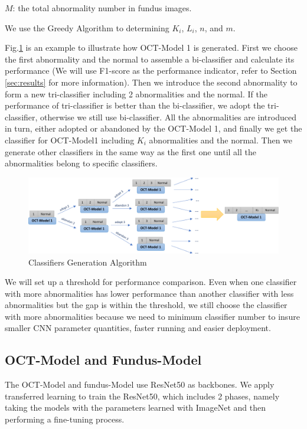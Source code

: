 \documentclass{article}
\begin{document}
		$M$: the total abnormality number in fundus images.
		
		\vspace{0.3cm}		
		We use the Greedy Algorithm to determining $K_i$, $L_i$, $n$, and $m$.
		
		Fig.\ref{fig:classifier} is an example to illustrate how OCT-Model 1 is generated.  First we choose the first abnormality and the normal to assemble a bi-classifier and calculate its performance (We will use F1-score as the performance indicator, refer to Section \ref{sec:results} for more information).  Then we introduce the second abnormality to form a new tri-classifier including 2 abnormalities and the normal.  If the performance of tri-classifier is better than the bi-classifier, we adopt the tri-classifier, otherwise we still use bi-classifier.  All the abnormalities are introduced in turn, either adopted or abandoned by the OCT-Model 1, and finally we get the classifier for OCT-Model1 including $K_i$ abnormalities and the normal.  Then we generate other classifiers in the same way as the first one until all the abnormalities belong to specific classifiers.

		\vspace{0.5cm}

		\begin{figure}[htbp]
			\centering
			\includegraphics[width=\linewidth]{Classifier.pdf}
			\caption{Classifiers Generation Algorithm}
			\label{fig:classifier}
		\end{figure}

		\vspace{0.5cm}	
		
		We will set up a threshold for performance comparison.  Even when one classifier with more abnormalities has lower performance than another classifier with less abnormalities but the gap is within the threshold, we still choose the classifier with more abnormalities because we need to minimum classifier number to insure smaller CNN parameter quantities, faster running and easier deployment.
				
	\subsection{OCT-Model and Fundus-Model}
		The OCT-Model and fundus-Model use ResNet50 as backbones.  We apply transferred learning to train the ResNet50, which includes 2 phases, namely taking the models with the parameters learned with ImageNet and then performing a fine-tuning process.  
		
\end{document}
